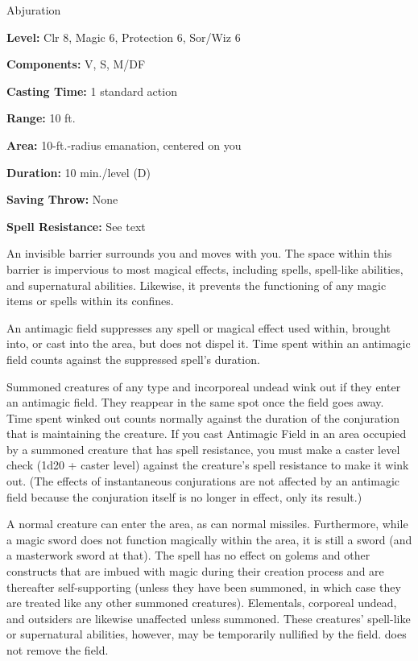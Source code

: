 
Abjuration

\textbf{Level:} Clr 8, Magic 6, Protection 6, Sor/Wiz 6

\textbf{Components:} V, S, M/DF

\textbf{Casting Time:} 1 standard action

\textbf{Range:} 10 ft.

\textbf{Area:} 10-ft.-radius emanation, centered on you

\textbf{Duration:} 10 min./level (D)

\textbf{Saving Throw:} None

\textbf{Spell Resistance:} See text

An invisible barrier surrounds you and moves with you. The space within this barrier 
is impervious to most magical effects, including spells, spell-like abilities, 
and supernatural abilities. Likewise, it prevents the functioning of any magic 
items or spells within its confines.

An antimagic field suppresses any spell or magical effect used within, 
brought into, or cast into the area, but does not dispel it. Time spent within 
an antimagic field counts against the suppressed spell's duration.

Summoned creatures of any type and incorporeal undead wink out if they enter an 
antimagic field. They reappear in the same spot once the field goes away. 
Time spent winked out counts normally against the duration of the conjuration that 
is maintaining the creature. If you cast Antimagic Field in an area occupied 
by a summoned creature that has spell resistance, you must make a caster level 
check (1d20 + caster level) against the creature's spell resistance to make it 
wink out. (The effects of instantaneous conjurations are not affected 
by an antimagic field because the conjuration itself is no longer in effect, 
only its result.)

A normal creature can enter the area, as can normal missiles. Furthermore, while 
a magic sword does not function magically within the area, it is still a sword 
(and a masterwork sword at that). The spell has no effect on golems and other constructs 
that are imbued with magic during their creation process and are thereafter self-supporting 
(unless they have been summoned, in which case they are treated like any other 
summoned creatures). Elementals, corporeal undead, and outsiders are likewise unaffected 
unless summoned. These creatures' spell-like or supernatural abilities, however, 
may be temporarily nullified by the field.  does not remove 
the field.

